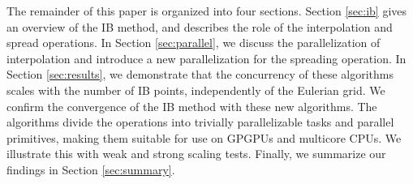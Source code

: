 The remainder of this paper is organized into four sections. Section \ref{sec:ib} gives
an overview of the IB method, and describes the role of the interpolation and spread
operations. In Section \ref{sec:parallel}, we discuss the parallelization of
interpolation and introduce a new parallelization for the spreading operation. In Section
\ref{sec:results}, we demonstrate that the concurrency of these algorithms scales with
the number of IB points, independently of the Eulerian grid. We confirm the convergence
of the IB method with these new algorithms. The algorithms divide the operations into
trivially parallelizable tasks and parallel primitives, making them suitable for use on
GPGPUs and multicore CPUs. We illustrate this with weak and strong scaling tests.
Finally, we summarize our findings in Section \ref{sec:summary}.

